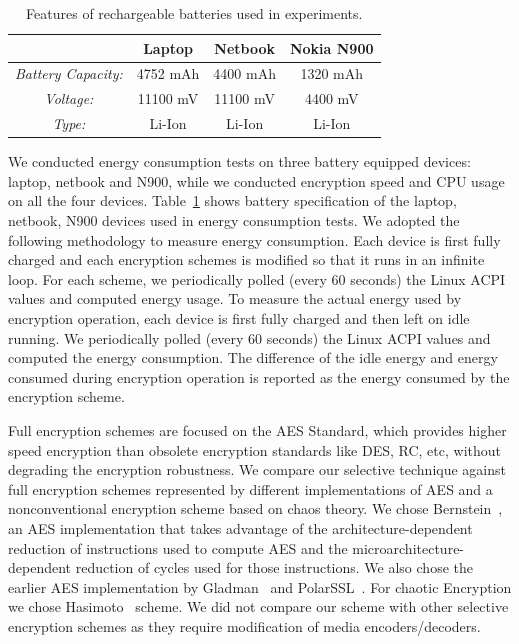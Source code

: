 \documentclass[preprint]{elsarticle}
\begin{document}
\begin{table}[!ht]
\centering
\begin{tabular}{cccc}
\cline{2-4} 
              &   \textbf{Laptop }      & \textbf{Netbook}   &  \textbf{Nokia N900} \\
              \hline
\textit{Battery Capacity:}     & 	4752 mAh            &  4400 mAh   & 1320 mAh  \\ \hline
\textit{Voltage:}             & 	11100 mV            &	11100 mV   &  4400 mV    \\ \hline
\textit{Type:}                 & 	Li-Ion              &	Li-Ion     &   Li-Ion  \\ 

\hline
\end{tabular}
\caption{Features of rechargeable batteries used in experiments.}
\label{table3}
\end{table}


We conducted energy consumption tests on three battery equipped devices: laptop, netbook and N900, while we conducted encryption speed and CPU usage on all the four devices. Table~\ref{table3} shows battery specification of the laptop, netbook, N900 devices used in energy consumption tests. We adopted the following methodology to measure energy consumption. Each device is first fully charged and each encryption schemes is modified so that it runs in an infinite loop. For each scheme, we periodically polled (every 60 seconds) the Linux ACPI values and computed energy usage. To measure the actual energy used by encryption operation, each device is first fully charged and then left on idle running. We periodically polled (every 60 seconds) the Linux ACPI values and computed the energy consumption. The difference of the idle energy and energy consumed during encryption operation is reported as the energy consumed by the encryption scheme.


Full encryption schemes are focused on the AES Standard, which provides higher speed encryption than obsolete encryption standards like DES, RC, etc, without degrading the encryption robustness. We compare our selective technique against full encryption schemes represented by different implementations of AES and a nonconventional encryption scheme based on chaos theory. We chose Bernstein~\cite{Bernstein2008}, an AES implementation that takes advantage of the architecture-dependent reduction of instructions used to compute AES and the microarchitecture-dependent reduction of cycles used for those instructions. We also chose the earlier AES implementation by Gladman~\cite{Gladman2006} and PolarSSL~\cite{NIST}. For chaotic Encryption we chose Hasimoto~\cite{Hasimoto2008} scheme. We did not compare our scheme with other selective encryption schemes as they require modification of media encoders/decoders.
\end{document}
